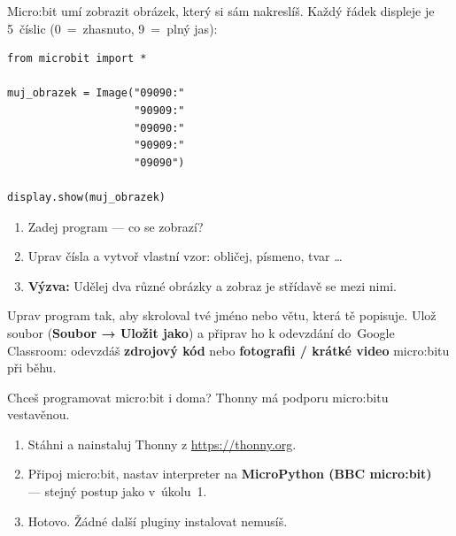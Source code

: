 \begin{bonusukol}

Micro:bit umí zobrazit obrázek, který si sám nakreslíš.
Každý řádek displeje je 5~číslic (0~=~zhasnuto, 9~=~plný jas):

\begin{lstlisting}
from microbit import *

muj_obrazek = Image("09090:"
                    "90909:"
                    "09090:"
                    "90909:"
                    "09090")

display.show(muj_obrazek)
\end{lstlisting}

\begin{enumerate}
  \item Zadej program — co se zobrazí?
  \item Uprav čísla a vytvoř vlastní vzor: obličej, písmeno, tvar \ldots
  \item \textbf{Výzva:} Udělej dva různé obrázky a zobraz je střídavě se
         mezi nimi.
\end{enumerate}

\odpoved[2cm]

\end{bonusukol}

\begin{ukol}

Uprav program tak, aby skroloval tvé jméno nebo větu, která tě popisuje.
Ulož soubor (\textbf{Soubor → Uložit jako}) a připrav ho k odevzdání do~Google Classroom:
odevzdáš \textbf{zdrojový kód} nebo \textbf{fotografii / krátké video} micro:bitu při běhu.

\end{ukol}

\vspace{\fill}
\begin{tcolorbox}[colback=gray!6, colframe=gray!35,
                  fonttitle=\small\bfseries, title=Thonny doma]
  \small
  Chceš programovat micro:bit i doma? Thonny má podporu micro:bitu vestavěnou.
  \begin{enumerate}
    \item Stáhni a nainstaluj Thonny z \url{https://thonny.org}.
    \item Připoj micro:bit, nastav interpreter na \textbf{MicroPython (BBC micro:bit)}\\
          — stejný postup jako v~úkolu~1.
    \item Hotovo. Žádné další pluginy instalovat nemusíš.
  \end{enumerate}
\end{tcolorbox}


